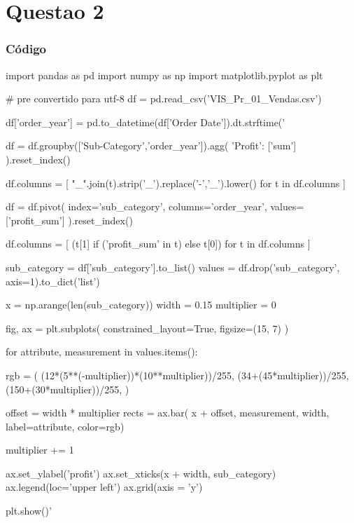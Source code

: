 \chapter{Questao 2}

\subsection*{Código}

\begin{python}
import pandas as pd
import numpy as np
import matplotlib.pyplot as plt

# pre convertido para utf-8
df = pd.read_csv('VIS_Pr_01_Vendas.csv')

df['order_year'] = pd.to_datetime(df['Order Date']).dt.strftime('%

df = df.groupby(['Sub-Category','order_year']).agg(
    {'Profit': ['sum']}
).reset_index()

df.columns = [
    "_".join(t).strip('_').replace('-','_').lower()
    for t in df.columns
]

df = df.pivot(
    index='sub_category',
    columns='order_year',
    values=['profit_sum']
).reset_index()

df.columns = [
    (t[1] if ('profit_sum' in t) else t[0])
    for t in df.columns
]

sub_category = df['sub_category'].to_list()
values = df.drop('sub_category', axis=1).to_dict('list')


x = np.arange(len(sub_category))
width = 0.15
multiplier = 0

fig, ax = plt.subplots(
    constrained_layout=True,
    figsize=(15, 7)
)

for attribute, measurement in values.items():
    
    rgb = (
        (12*(5**(-multiplier))*(10**multiplier))/255,
        (34+(45*multiplier))/255,
        (150+(30*multiplier))/255,
    )    
    
    offset = width * multiplier
    rects = ax.bar(
        x + offset,
        measurement,
        width,
        label=attribute,
        color=rgb)
        
    multiplier += 1

ax.set_ylabel('profit')
ax.set_xticks(x + width, sub_category)
ax.legend(loc='upper left')
ax.grid(axis = 'y')

plt.show()'
\end{python}


